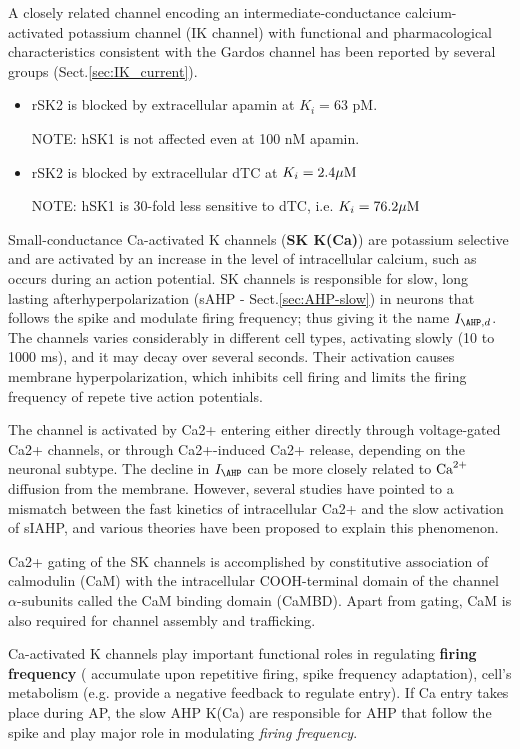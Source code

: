 A closely related channel encoding an intermediate-conductance calcium-activated
potassium channel (IK channel) with functional and pharmacological
characteristics consistent with the Gardos channel has been reported by several
groups (Sect.\ref{sec:IK_current}).


\begin{itemize}
  \item rSK2 is blocked by extracellular apamin at $K_i = 63$ pM.

NOTE: hSK1 is not affected even at 100 nM apamin.
  
  \item rSK2 is blocked by extracellular dTC at $K_i = 2.4{\mu\text{M}}$
  
NOTE: hSK1 is 30-fold less sensitive to dTC, i.e. $K_i = 76.2{\mu\text{M}}$
   
\end{itemize}


Small-conductance Ca-activated K channels ({\bf SK K(Ca)}) are potassium
selective and are activated by an increase in the level of intracellular
calcium,  such  as  occurs  during  an  action  potential.
 SK channels is responsible for
slow, long lasting afterhyperpolarization (sAHP -
Sect.\ref{sec:AHP-slow}) in neurons that follows the spike and modulate
firing frequency; thus giving it the name $I_{\AHP,d}$.
The channels varies considerably in different cell types, activating slowly (10
to 1000 ms), and it may decay over several seconds.
Their  activation  causes  membrane hyperpolarization, which inhibits cell
firing and limits the firing frequency of repete tive  action  potentials.

The channel is activated by Ca2+ entering either directly through voltage-gated
Ca2+ channels, or through Ca2+-induced Ca2+ release, depending on the neuronal
subtype.
The decline in $I_\AHP$ can be more closely related to ${\text{Ca}^{2+}}$ diffusion from the
membrane.  However, several studies have pointed to a mismatch between the fast
kinetics of intracellular Ca2+ and the slow activation of sIAHP, and various
theories have been proposed to explain this phenomenon.

Ca2+ gating of the SK channels is accomplished by constitutive association of
calmodulin (CaM) with the intracellular COOH-terminal domain of the channel
$\alpha$-subunits called the CaM binding domain (CaMBD). Apart from gating, CaM
is also required for channel assembly and trafficking.

Ca-activated K channels play important functional roles in regulating {\bf
firing frequency} ( accumulate upon repetitive firing, spike frequency
adaptation), cell's metabolism (e.g. provide a negative feedback to regulate
 entry).  If Ca entry takes place during AP, the slow AHP K(Ca) are
responsible for AHP that follow the spike and play major role in modulating {\it
firing frequency}.

